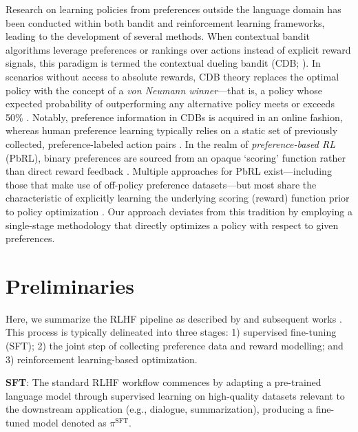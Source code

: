 Research on learning policies from preferences outside the language domain has been conducted within both bandit and reinforcement learning frameworks, leading to the development of several methods. When contextual bandit algorithms leverage preferences or rankings over actions instead of explicit reward signals, this paradigm is termed the contextual dueling bandit (CDB; \cite{yue2012karmed,dudik2015contextual}). In scenarios without access to absolute rewards, CDB theory replaces the optimal policy with the concept of a \textit{von Neumann winner}—that is, a policy whose expected probability of outperforming any alternative policy meets or exceeds 50\% \citep{dudik2015contextual}. Notably, preference information in CDBs is acquired in an online fashion, whereas human preference learning typically relies on a static set of previously collected, preference-labeled action pairs \citep{yan2022human}. In the realm of \textit{preference-based RL} (PbRL), binary preferences are sourced from an opaque `scoring' function rather than direct reward feedback \citep{BusaFekete2014,ruiz2023dueling}. Multiple approaches for PbRL exist—including those that make use of off-policy preference datasets—but most share the characteristic of explicitly learning the underlying scoring (reward) function prior to policy optimization \citep{jain2013learning,BusaFekete2014,christiano2017deep,sadigh2017active,kupcsik2018learning}. Our approach deviates from this tradition by employing a single-stage methodology that directly optimizes a policy with respect to given preferences.

\section{Preliminaries}\label{section:prelims}

Here, we summarize the RLHF pipeline as described by \citeauthor{ziegler2020finetuning} and subsequent works \citep{stiennon2022learning, bai2022training, ouyang2022training}. This process is typically delineated into three stages: 1) supervised fine-tuning (SFT); 2) the joint step of collecting preference data and reward modelling; and 3) reinforcement learning-based optimization.

\textbf{SFT}: The standard RLHF workflow commences by adapting a pre-trained language model through supervised learning on high-quality datasets relevant to the downstream application (e.g., dialogue, summarization), producing a fine-tuned model denoted as $\pi^\text{SFT}$.

